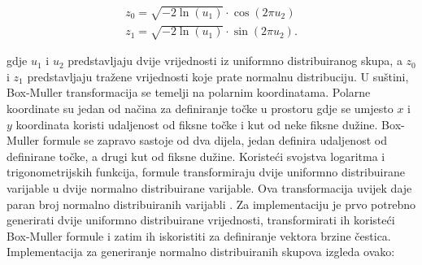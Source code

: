 \documentclass{foi}
\begin{document}
 \begin{align*}
z_0 = \sqrt{-2 \ln(u_1)} \cdot \cos(2 \pi u_2)
\\
z_1 = \sqrt{-2 \ln(u_1)} \cdot \sin(2 \pi u_2).
\end{align*}

gdje $u_1$ i $u_2$ predstavljaju dvije vrijednosti iz uniformno distribuiranog skupa, a $z_0$ i $z_1$ predstavljaju tražene vrijednosti koje prate normalnu distribuciju. U suštini, Box-Muller transformacija se temelji na polarnim koordinatama. Polarne koordinate su jedan od načina za definiranje točke u prostoru gdje se umjesto $x$ i $y$ koordinata koristi udaljenost od fiksne točke i kut od neke fiksne dužine. Box-Muller formule se zapravo sastoje od dva dijela, jedan definira udaljenost od definirane točke, a drugi kut od fiksne dužine. Koristeći svojstva logaritma i trigonometrijskih funkcija, formule transformiraju dvije uniformno distribuirane varijable u dvije normalno distribuirane varijable. Ova transformacija uvijek daje paran broj normalno distribuiranih varijabli \parencite{BoxMullerBezDat}. Za implementaciju je prvo potrebno generirati dvije uniformno distribuirane vrijednosti, transformirati ih koristeći Box-Muller formule i zatim ih iskoristiti za definiranje vektora brzine čestica. Implementacija za generiranje normalno distribuiranih skupova izgleda ovako:
\end{document}
